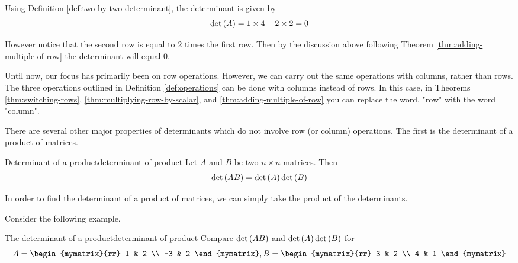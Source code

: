 \begin{solution}
Using Definition \ref{def:two-by-two-determinant}, the determinant is given by
\[
\det \left(A \right) = 1 \times 4 - 2 \times 2 = 0
\]

However notice that the second row is equal to $2$ times the first row. Then by the discussion above following Theorem \ref{thm:adding-multiple-of-row} the determinant will equal $0$.
\end{solution}

Until now, our focus has primarily been on row operations. However, we can carry out the 
same operations with columns, rather than rows. The three operations outlined in
Definition \ref{def:operations} can be done with columns instead of rows. 
In this case, in Theorems \ref{thm:switching-rows}, \ref{thm:multiplying-row-by-scalar}, 
and \ref{thm:adding-multiple-of-row} you can replace
the word, "row" with the word "column".

There are several other major properties of determinants which do not involve
row (or column) operations. The first is the determinant of a product of matrices. 

\begin{theorem}{Determinant of a product}{determinant-of-product}
Let $A$ and $B$ be two $n\times n$ matrices. Then
\begin{equation*}
\det \left(AB\right) =\det \left(A\right) \det \left(B\right)
\end{equation*}
\end{theorem}

In order to find the determinant of a product of matrices, we can simply take the product of the determinants. 

Consider the following example.

\begin{example}{The determinant of a product}{determinant-of-product}
Compare $\det \left(AB\right) $ and $\det \left(A\right) \det \left(
B\right) $ for
\begin{equation*}
A=\begin{mymatrix}{rr}
1 & 2 \\
-3 & 2
\end{mymatrix} ,B=\begin{mymatrix}{rr}
3 & 2 \\
4 & 1
\end{mymatrix} 
\end{equation*}
\end{example}

